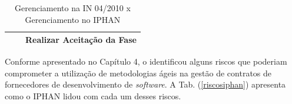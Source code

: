 \begin{table}[H]
\begin{tabular}{|p{3.0cm}|p{4.0cm}|p{3.0cm}|p{4.0cm}|}
\multicolumn{2}{|l|}{}                                                                                                                                                                                                  &                                  & Realizar Aceitação da Fase                                                                                                      \\ \hline
\end{tabular}
\caption{Gerenciamento na IN 04/2010 x Gerenciamento no IPHAN}
\label{gctiiphan}
\end{table}


Conforme apresentado no Capítulo 4, o  identificou alguns riscos que poderiam comprometer a utilização de metodologias ágeis na gestão de contratos de fornecedores de desenvolvimento de \textit{software}. A Tab. (\ref{riscosiphan}) apresenta como o IPHAN lidou com cada um desses riscos.



